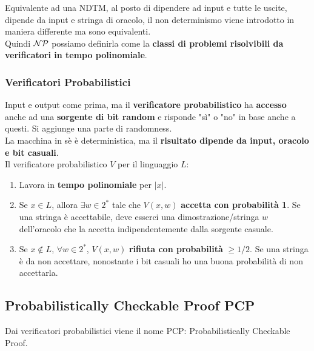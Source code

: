 Equivalente ad una NDTM, al posto di dipendere ad input e tutte le uscite, dipende da input e stringa di oracolo, il non determinismo viene introdotto in maniera differente ma sono equivalenti.\\

Quindi $\mathcal{NP}$ possiamo definirla come la \textbf{classi di problemi risolvibili da verificatori in tempo polinomiale}.

\newpage

\subsubsection{Verificatori Probabilistici}

Input e output come prima, ma il \textbf{verificatore probabilistico} ha \textbf{accesso} anche ad una \textbf{sorgente di bit random} e risponde "sì" o "no" in base anche a questi. Si aggiunge una parte di randomness.\\

La macchina in sè è deterministica, ma il \textbf{risultato dipende da input, oracolo e bit casuali}.\\

Il verificatore probabilistico $V$ per il linguaggio $L$: 
\begin{enumerate}
	\item Lavora in \textbf{tempo polinomiale} per $|x|$.\\
	
	\item Se $x \in L$, allora $\exists w \in 2^\ast$ tale che $V(x,w)$ \textbf{accetta con probabilità 1}. Se una stringa è accettabile, deve esserci una dimostrazione/stringa $w$ dell'oracolo che la accetta indipendentemente dalla sorgente casuale.\\
	
	\item Se $x \notin L$, $\forall w \in 2^\ast$, $V(x,w)$ \textbf{rifiuta con probabilità} $\geq 1/2$. Se una stringa è da non accettare, nonostante i bit casuali ho una buona probabilità di non accettarla.\\
\end{enumerate}

\newpage

\subsection{Probabilistically Checkable Proof PCP}

Dai verificatori probabilistici viene il nome PCP: Probabilistically Checkable Proof.\\

